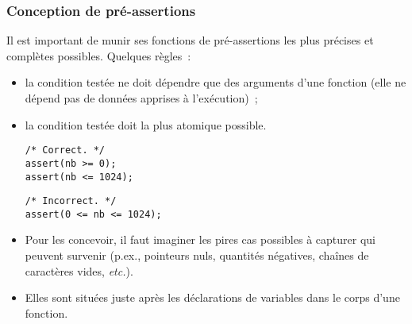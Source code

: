 \begin{frame}[fragile] \frametitle{Conception de pré-assertions}
Il est important de munir ses fonctions de pré-assertions les plus 
précises et complètes possibles. Quelques règles~:

\begin{itemize}
    \item la condition testée ne doit dépendre que des arguments d'une 
    fonction (elle ne dépend pas de données apprises à l'exécution)~;
    \smallskip
    
    \item la condition testée doit la plus atomique possible.
    \begin{multicols}{2}
        \begin{lstlisting}
/* Correct. */
assert(nb >= 0);
assert(nb <= 1024);
        \end{lstlisting}
  
        \begin{lstlisting}
/* Incorrect. */
assert(0 <= nb <= 1024);
        \end{lstlisting}
    \end{multicols}
    \smallskip
    
    \item Pour les concevoir, il faut imaginer les pires cas possibles
    à capturer qui peuvent survenir (p.ex., pointeurs nuls, quantités
    négatives, chaînes de caractères vides, {\em etc.}).
    \smallskip
    
    \item Elles sont situées juste après les déclarations de variables
    dans le corps d'une fonction.
\end{itemize}
\end{frame}

